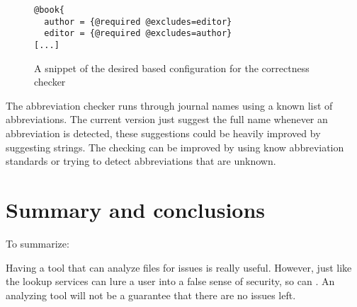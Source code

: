 \begin{figure}
  \centering
\begin{verbatim}
@book{
  author = {@required @excludes=editor}
  editor = {@required @excludes=author}
[...]
\end{verbatim}
  \caption{A snippet of the desired {\bibtex} based configuration for the correctness checker}
  \label{fig:correctness_checker_bibtex}
\end{figure}

The abbreviation checker runs through journal names using a known list
of abbreviations.  The current version just suggest the full name
whenever an abbreviation is detected, these suggestions could be
heavily improved by suggesting strings.  The checking can be improved
by using know abbreviation standards or trying to detect abbreviations
that are unknown.



\section{Summary and conclusions}

To summarize:

Having a tool that can analyze {\bibtex} files for issues is really
useful.  However, just like the lookup services can lure a user into
a false sense of security, so can \orangutan.  An analyzing tool will
not be a guarantee that there are no issues left.
